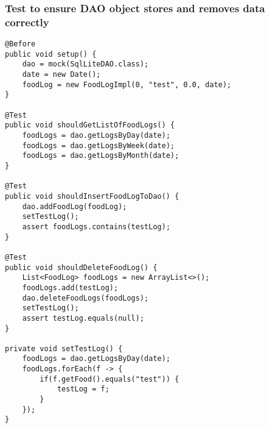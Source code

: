\subsubsection*{Test to ensure DAO object stores and removes data correctly}
\begin{lstlisting}[style=Java]
@Before
public void setup() {
    dao = mock(SqlLiteDAO.class);
    date = new Date();
    foodLog = new FoodLogImpl(0, "test", 0.0, date);
}

@Test
public void shouldGetListOfFoodLogs() {
    foodLogs = dao.getLogsByDay(date);
    foodLogs = dao.getLogsByWeek(date);
    foodLogs = dao.getLogsByMonth(date);
}

@Test
public void shouldInsertFoodLogToDao() {
    dao.addFoodLog(foodLog);
    setTestLog();
    assert foodLogs.contains(testLog);
}

@Test
public void shouldDeleteFoodLog() {
    List<FoodLog> foodLogs = new ArrayList<>();
    foodLogs.add(testLog);
    dao.deleteFoodLogs(foodLogs);
    setTestLog();
    assert testLog.equals(null);
}

private void setTestLog() {
    foodLogs = dao.getLogsByDay(date);
    foodLogs.forEach(f -> {
        if(f.getFood().equals("test")) {
            testLog = f;
        }
    });
}
\end{lstlisting}